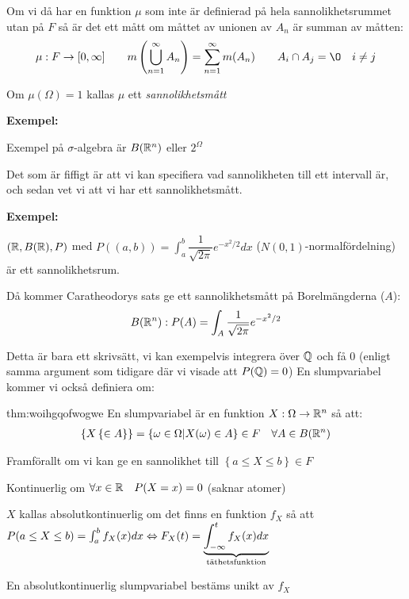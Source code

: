 \par\bigskip
\noindent Om vi då har en funktion $\mu$ som inte är definierad på hela sannolikhetsrummet utan på $F$ så är det ett mått om måttet av unionen av $A_n$ är summan av måtten:
\begin{equation*}
  \begin{gathered}
    \mu:F\to[0,\infty]\qquad m\left(\bigcup_{n=1}^{\infty}A_n\right) = \sum_{n=1}^{\infty}m(A_n)\qquad A_i\cap A_j = \O\quad i\neq j
  \end{gathered}
\end{equation*}\par
\noindent Om $\mu(\Omega) = 1$ kallas $\mu$ ett \textit{sannolikhetsmått}
\par\bigskip
\noindent\textbf{Exempel:}\par
\noindent Exempel på $\sigma$-algebra är $B(\mathbb{R}^n)$ eller $2^\Omega$
\par\bigskip
\noindent Det som är fiffigt är att vi kan specifiera vad sannolikheten till ett intervall är, och sedan vet vi att vi har ett sannolikhetsmått.
\par\bigskip
\noindent\textbf{Exempel:}\par
\noindent $(\mathbb{R},B(\mathbb{R}),P)$ med $P((a,b)) = \int_{a}^{b}\dfrac{1}{\sqrt{2\pi}}e^{-x^2/2}dx$ ($N(0,1)$-normalfördelning) är ett sannolikhetsrum.\par
\noindent Då kommer Caratheodorys sats ge ett sannolikhetsmått på Borelmängderna ($A$):
\begin{equation*}
  \begin{gathered}
    B(\mathbb{R}^n): P(A) = \int_{A}\dfrac{1}{\sqrt{2\pi}}e^{-x^2/2}
  \end{gathered}
\end{equation*}\par
\noindent Detta är bara ett skrivsätt, vi kan exempelvis integrera över $\mathbb{Q}$ och få 0 (enligt samma argument som tidigare där vi visade att $P(\mathbb{Q}) = 0$)
\newpage
\noindent En slumpvariabel kommer vi också definiera om:
\par\bigskip
\begin{theo}[Slumpvariabel V2]{thm:woihgqofwogwe}
  En slumpvariabel är en funktion $X:\Omega\to\mathbb{R}^n$ så att:
  \begin{equation*}
    \begin{gathered}
    \left\{X\left\{\in A\right\}\right\} = \left\{\omega\in\Omega|X(\omega)\in A\right\}\in F\quad \forall A\in B(\mathbb{R}^n)
    \end{gathered}
  \end{equation*}\par
  \noindent Framförallt om vi kan ge en sannolikhet till $\left\{a\leq X\leq b\right\}\in F$
  \par\bigskip
  \noindent Kontinuerlig om $\forall x\in\mathbb{R}\quad P(X=x)=0$ (saknar atomer)\par
  \noindent $X$ kallas absolutkontinuerlig om det finns en funktion $f_X$ så att $P(a\leq X\leq b) = \int_{a}^{b}f_X(x)dx\Leftrightarrow F_X(t) = \underbrace{\int_{-\infty}^{t}f_X(x)dx}_{\text{täthetsfunktion}}$
  \par\bigskip
  \noindent En absolutkontinuerlig slumpvariabel bestäms unikt av $f_X$
\end{theo}

